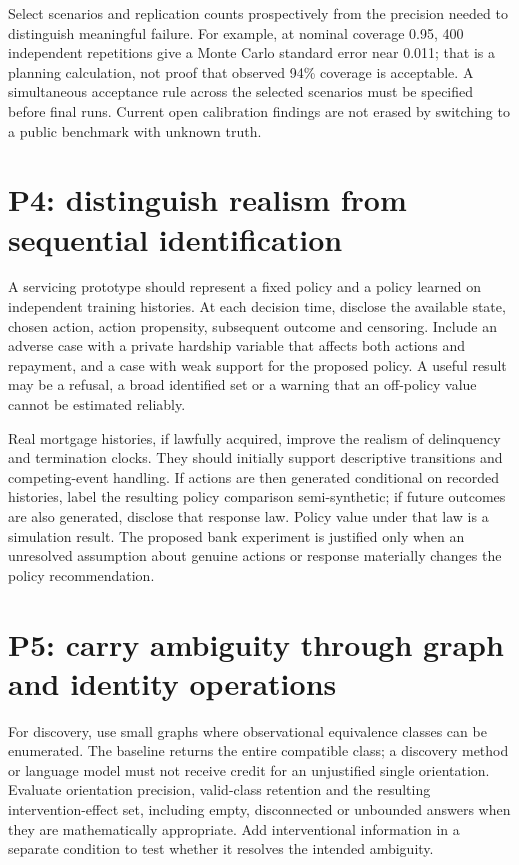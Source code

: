 Select scenarios and replication counts prospectively from the precision
needed to distinguish meaningful failure. For example, at nominal
coverage 0.95, 400 independent repetitions give a Monte Carlo standard
error near 0.011; that is a planning calculation, not proof that
observed 94\% coverage is acceptable. A simultaneous acceptance rule
across the selected scenarios must be specified before final runs.
Current open calibration findings are not erased by switching to a
public benchmark with unknown truth.

\hypertarget{p4-distinguish-realism-from-sequential-identification}{%
\section{P4: distinguish realism from sequential
identification}\label{p4-distinguish-realism-from-sequential-identification}}

A servicing prototype should represent a fixed policy and a policy
learned on independent training histories. At each decision time,
disclose the available state, chosen action, action propensity,
subsequent outcome and censoring. Include an adverse case with a private
hardship variable that affects both actions and repayment, and a case
with weak support for the proposed policy. A useful result may be a
refusal, a broad identified set or a warning that an off-policy value
cannot be estimated reliably.

Real mortgage histories, if lawfully acquired, improve the realism of
delinquency and termination clocks. They should initially support
descriptive transitions and competing-event handling. If actions are
then generated conditional on recorded histories, label the resulting
policy comparison semi-synthetic; if future outcomes are also generated,
disclose that response law. Policy value under that law is a simulation
result. The proposed bank experiment is justified only when an
unresolved assumption about genuine actions or response materially
changes the policy recommendation.

\hypertarget{p5-carry-ambiguity-through-graph-and-identity-operations}{%
\section{P5: carry ambiguity through graph and identity
operations}\label{p5-carry-ambiguity-through-graph-and-identity-operations}}

For discovery, use small graphs where observational equivalence classes
can be enumerated. The baseline returns the entire compatible class; a
discovery method or language model must not receive credit for an
unjustified single orientation. Evaluate orientation precision,
valid-class retention and the resulting intervention-effect set,
including empty, disconnected or unbounded answers when they are
mathematically appropriate. Add interventional information in a separate
condition to test whether it resolves the intended ambiguity.

